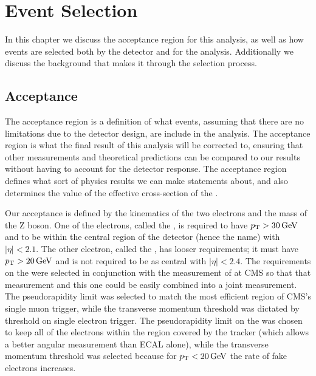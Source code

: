 \chapter{Event Selection}
\label{event_selection_chapter}

In this chapter we discuss the acceptance region for this analysis, as well as
how events are selected both by the detector and for the analysis. Additionally
we discuss the background that makes it through the selection process.

\section{Acceptance}
\label{sec:acceptance}

The acceptance region is a definition of what events, assuming that there are
no limitations due to the detector design, are include in the analysis. The
acceptance region is what the final result of this analysis will be corrected
to, ensuring that other measurements and theoretical predictions can be
compared to our results without having to account for the detector response.
The acceptance region defines what sort of physics results we can make
statements about, and also determines the value of the effective cross-section
of the \Z.

Our acceptance is defined by the kinematics of the two electrons and the mass
of the Z boson. One of the electrons, called the \CentralElectron, is required
to have $p_{\mathrm{T}} > 30 \,\text{Ge\hspace{-.08em}V}$ and to be within the central region of the detector
(hence the name) with $|\eta| < 2.1$. The other electron, called the
\ExtendedElectron, has looser requirements; it must have $p_{\mathrm{T}} > 20 \,\text{Ge\hspace{-.08em}V}$ and is
not required to be as central with $|\eta| < 2.4$. The requirements on the
\CentralElectron were selected in conjunction with the \Ztomumu measurement of
\phistar at CMS so that that measurement and this one could be easily combined
into a joint measurement. The pseudorapidity limit was selected to match the
most efficient region of CMS's single muon trigger, while the transverse
momentum threshold was dictated by threshold on single electron trigger. The
pseudorapidity limit on the \ExtendedElectron was chosen to keep all of the
electrons within the region covered by the tracker (which allows a better
angular measurement than ECAL alone), while the transverse momentum threshold
was selected because for $p_{\mathrm{T}} < 20 \,\text{Ge\hspace{-.08em}V}$ the rate of fake electrons increases.

